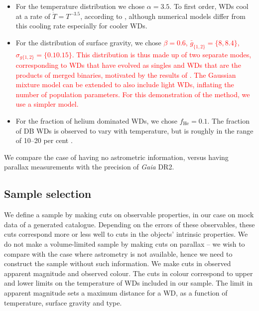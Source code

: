 \documentclass[fleqn,usenatbib]{mnras}
\newcommand{\changes}[1]{\textcolor{red}{#1}}
\newcommand{\Teff}{T}
\begin{document}
\begin{itemize}
	\item For the temperature distribution we chose $\alpha=3.5$. To first order, WDs cool at a rate of $\dot{\Teff} = \Teff^{-3.5}$, according to \cite{1952MNRAS.112..583M}, although numerical models differ from this cooling rate especially for cooler WDs.
	\item For the distribution of surface gravity, we chose \changes{$\beta=0.6$, $\bar{g}_{\{1,2\}}=\{8,8.4\}$, $\sigma_{g\{1,2\}}=\{0.10.15\}$. This distribution is thus made up of two separate modes, corresponding to WDs that have evolved as singles and WDs that are the products of merged binaries, motivated by the results of \citep{2018MNRAS.479L.113K}. The Gaussian mixture model can be extended to also include light WDs, inflating the number of population parameters. For this demonstration of the method, we use a simpler model.}
	\item For the fraction of helium dominated WDs, we chose $f_\text{He}=0.1$. The fraction of DB WDs is observed to vary with temperature, but is roughly in the range of 10--20 per cent \citep{2011ApJ...737...28B}.
\end{itemize}

We compare the case of having no astrometric information, versus having parallax measurements with the precision of \emph{Gaia} DR2.




\subsection{Sample selection}\label{sec:sample_cuts}

We define a sample by making cuts on observable properties, in our case on mock data of a generated catalogue. Depending on the errors of these observables, these cuts correspond more or less well to cuts in the objects' intrinsic properties. We do not make a volume-limited sample by making cuts on parallax -- we wish to compare with the case where astrometry is not available, hence we need to construct the sample without such information. We make cuts in observed apparent magnitude and observed colour. The cuts in colour correspond to upper and lower limits on the temperature of WDs included in our sample. The limit in apparent magnitude sets a maximum distance for a WD, as a function of temperature, surface gravity and type.
\end{document}
